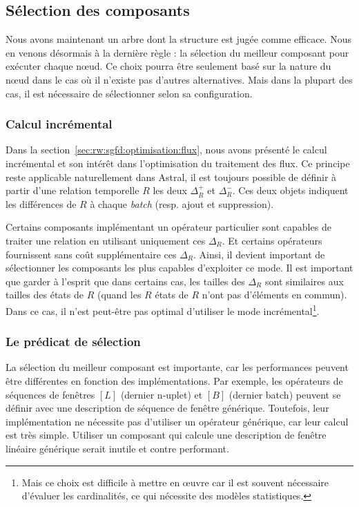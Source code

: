 \subsection{Sélection des composants}
Nous avons maintenant un arbre dont la structure est jugée comme efficace. Nous en venons désormais à la dernière règle : la sélection du meilleur composant pour exécuter chaque nœud. Ce choix pourra être seulement basé sur la nature du nœud dans le cas où il n'existe pas d'autres alternatives. Mais dans la plupart des cas, il est nécessaire de sélectionner selon sa configuration.

\subsubsection{Calcul incrémental}
Dans la section~\ref{sec:rw:sgfd:optimisation:flux}, nous avons présenté le calcul incrémental et son intérêt dans l'optimisation du traitement des flux. Ce principe reste applicable naturellement dans Astral, il est toujours possible de définir à partir d'une relation temporelle $R$ les deux $\Delta_R^+$ et $\Delta_R^-$. Ces deux objets indiquent les différences de $R$ à chaque \textit{batch} (resp. ajout et suppression). 

Certains composants implémentant un opérateur particulier sont capables de traiter une relation en utilisant uniquement ces $\Delta_R$. Et certains opérateurs fournissent sans coût supplémentaire ces $\Delta_R$. Ainsi, il devient important de sélectionner les composants les plus capables d'exploiter ce mode. Il est important que garder à l'esprit que dans certains cas, les tailles des $\Delta_R$ sont similaires aux tailles des états de $R$ (quand les $R$ états de $R$ n'ont pas d'éléments en commun). Dans ce cas, il n'est peut-être pas optimal d'utiliser le mode incrémental\footnote{Mais ce choix est difficile à mettre en œuvre car il est souvent nécessaire d'évaluer les cardinalités, ce qui nécessite des modèles statistiques.}.

\subsubsection{Le prédicat de sélection}
La sélection du meilleur composant est importante, car les performances peuvent être différentes en fonction des implémentations. Par exemple, les opérateurs de séquences de fenêtres $[L]$ (dernier n-uplet) et $[B]$ (dernier batch) peuvent se définir avec une description de séquence de fenêtre générique. Toutefois, leur implémentation ne nécessite pas d'utiliser un opérateur générique, car leur calcul est très simple. Utiliser un composant qui calcule une description de fenêtre linéaire générique serait inutile et contre performant. 

